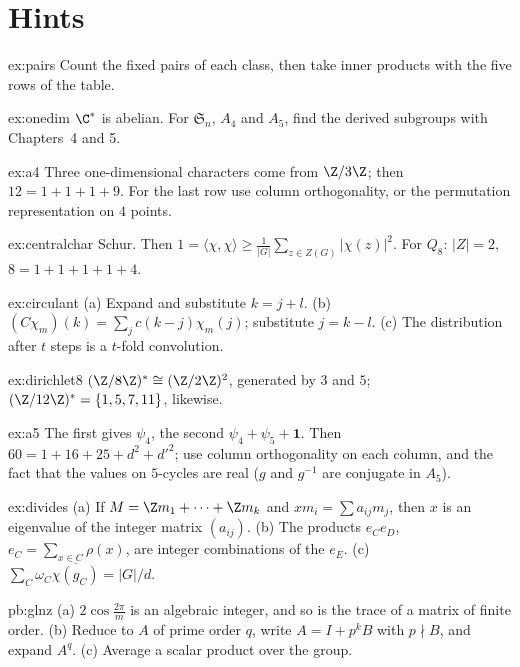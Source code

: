 \section{Hints}

\begin{hint}{ex:pairs}
Count the fixed pairs of each class, then take inner products with the five rows of the table.
\end{hint}
\begin{hint}{ex:onedim}
$\C^*$ is abelian. For $\mathfrak S_n$, $A_4$ and $A_5$, find the derived subgroups with Chapters~4 and 5.
\end{hint}
\begin{hint}{ex:a4}
Three one-dimensional characters come from $\Z/3\Z$; then $12=1+1+1+9$. For the last row use column orthogonality, or the permutation representation on $4$ points.
\end{hint}
\begin{hint}{ex:centralchar}
Schur. Then $1=\langle\chi,\chi\rangle\ge\frac1{|G|}\sum_{z\in Z(G)}|\chi(z)|^2$. For $Q_8$: $|Z|=2$, $8=1+1+1+1+4$.
\end{hint}
\begin{hint}{ex:circulant}
(a) Expand and substitute $k=j+l$. (b) $(C\chi_m)(k)=\sum_jc(k-j)\chi_m(j)$; substitute $j=k-l$. (c) The distribution after $t$ steps is a $t$-fold convolution.
\end{hint}
\begin{hint}{ex:dirichlet8}
$(\Z/8\Z)^*\cong(\Z/2\Z)^2$, generated by $3$ and $5$; $(\Z/12\Z)^*=\{1,5,7,11\}$, likewise.
\end{hint}
\begin{hint}{ex:a5}
The first gives $\psi_4$, the second $\psi_4+\psi_5+\mathbf1$. Then $60=1+16+25+d^2+d'^2$; use column orthogonality on each column, and the fact that the values on $5$-cycles are real ($g$ and $g^{-1}$ are conjugate in $A_5$).
\end{hint}
\begin{hint}{ex:divides}
(a) If $M=\Z m_1+\dots+\Z m_k$ and $xm_i=\sum a_{ij}m_j$, then $x$ is an eigenvalue of the integer matrix $(a_{ij})$. (b) The products $e_Ce_D$, $e_C=\sum_{x\in C}\rho(x)$, are integer combinations of the $e_E$. (c) $\sum_C\omega_C\overline{\chi(g_C)}=|G|/d$.
\end{hint}

\begin{hint}{pb:glnz}
(a) $2\cos\frac{2\pi}m$ is an algebraic integer, and so is the trace of a matrix of finite order. (b) Reduce to $A$ of prime
order $q$, write $A=I+p^kB$ with $p\nmid B$, and expand $A^q$. (c) Average a scalar product over the group.
\end{hint}

